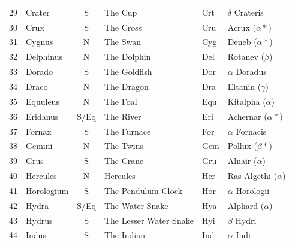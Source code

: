 \documentclass[a4paper,12pt]{extarticle}
\begin{document}
\begin{table}[H]
\begin{tabular}{llclll}
29 & Crater          & S    & The Cup                & Crt & $\delta$ Crateris                  \\
30 & Crux            & S    & The Cross              & Cru & Acrux ($\alpha \ast$)              \\
31 & Cygnus          & N    & The Swan               & Cyg & Deneb ($\alpha \ast$)              \\
32 & Delphinus       & N    & The Dolphin            & Del & Rotanev ($\beta$)                  \\
33 & Dorado          & S    & The Goldfish           & Dor & $\alpha$ Doradus                   \\
34 & Draco           & N    & The Dragon             & Dra & Eltanin ($\gamma$)                  \\
35 & Equuleus        & N    & The Foal               & Equ & Kitalpha ($\alpha$) \\
36 & Eridanus        & S/Eq & The River              & Eri & Achernar ($\alpha \ast$)           \\
37 & Fornax          & S    & The Furnace            & For & $\alpha$ Fornacis                  \\
38 & Gemini          & N    & The Twins              & Gem & Pollux ($\beta \ast$)              \\
39 & Grus            & S    & The Crane              & Gru & Alnair ($\alpha$)                  \\
40 & Hercules        & N    & Hercules               & Her & Ras Algethi ($\alpha$)             \\
41 & Horologium      & S    & The Pendulum Clock     & Hor & $\alpha$ Horologii                 \\
42 & Hydra           & S/Eq & The Water Snake        & Hya & Alphard ($\alpha$)                 \\
43 & Hydrus          & S    & The Lesser Water Snake & Hyi & $\beta$ Hydri                      \\
44 & Indus           & S    & The Indian             & Ind & $\alpha$ Indi      
\end{tabular}
\end{table}

\clearpage
\end{document}
